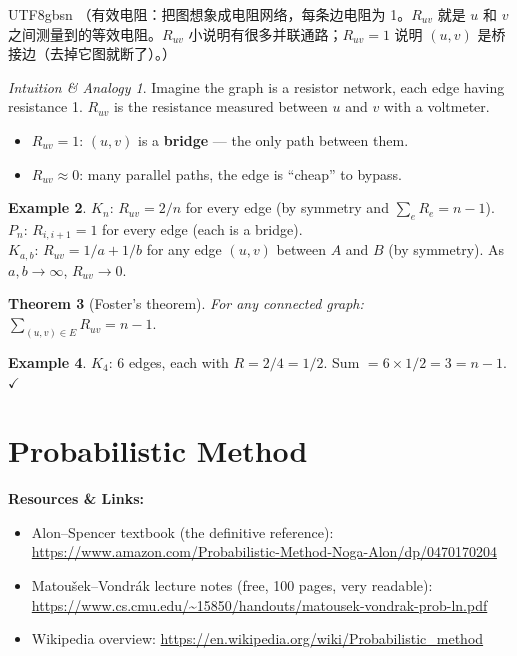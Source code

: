 \documentclass[12pt]{article}
\newtheorem{theorem}{Theorem}[section]
\theoremstyle{definition}
\newtheorem{example}[theorem]{Example}
\theoremstyle{remark}
\newtheorem{intuition}[theorem]{Intuition \& Analogy}
\newcommand{\resources}[1]{%
  \vspace{4pt}
  \noindent\colorbox{blue!8}{\parbox{\dimexpr\linewidth-2\fboxsep}{%
    \small\textbf{Resources \& Links:} #1}}
  \vspace{4pt}
}
\begin{document}
\begin{CJK}{UTF8}{gbsn}
（有效电阻：把图想象成电阻网络，每条边电阻为 1。$R_{uv}$ 就是 $u$ 和 $v$ 之间测量到的等效电阻。$R_{uv}$ 小说明有很多并联通路；$R_{uv} = 1$ 说明 $(u,v)$ 是桥接边（去掉它图就断了）。）
\end{CJK}

\begin{intuition}
Imagine the graph is a resistor network, each edge having resistance 1.
$R_{uv}$ is the resistance measured between $u$ and $v$ with a voltmeter.
\begin{itemize}
  \item $R_{uv} = 1$: $(u,v)$ is a \textbf{bridge} --- the only path between them.
  \item $R_{uv} \approx 0$: many parallel paths, the edge is ``cheap'' to bypass.
\end{itemize}
\end{intuition}

\begin{example}
$K_n$: $R_{uv} = 2/n$ for every edge (by symmetry and $\sum_e R_e = n-1$).\\
$P_n$: $R_{i,i+1} = 1$ for every edge (each is a bridge). \\
$K_{a,b}$: $R_{uv} = 1/a + 1/b$ for any edge $(u,v)$ between $A$ and $B$
(by symmetry).  As $a,b\to\infty$, $R_{uv} \to 0$.
\end{example}

\begin{theorem}[Foster's theorem]
For any connected graph:
$\displaystyle\sum_{(u,v)\in E} R_{uv} = n-1.$
\end{theorem}

\begin{example}
$K_4$: 6 edges, each with $R = 2/4 = 1/2$.  Sum $= 6 \times 1/2 = 3 = n-1$. $\checkmark$
\end{example}

\section{Probabilistic Method}

\resources{
\begin{itemize}\setlength\itemsep{0pt}
  \item Alon--Spencer textbook (the definitive reference):
        \url{https://www.amazon.com/Probabilistic-Method-Noga-Alon/dp/0470170204}
  \item Matou\v{s}ek--Vondr\'ak lecture notes (free, 100 pages, very readable):
        \url{https://www.cs.cmu.edu/~15850/handouts/matousek-vondrak-prob-ln.pdf}
  \item Wikipedia overview:
        \url{https://en.wikipedia.org/wiki/Probabilistic_method}
\end{itemize}
}
\end{document}
